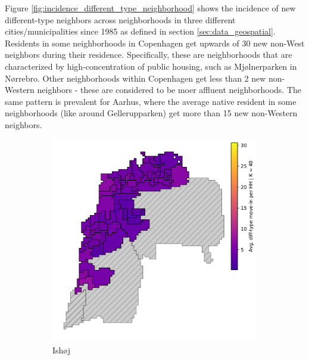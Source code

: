 \documentclass[main.tex]{subfiles}
\begin{document}
Figure \ref{fig:incidence_different_type_neighborhood} shows the incidence of new different-type neighbors across neighborhoods in three different cities/municipalities since 1985 as defined in section \ref{sec:data_geospatial}. Residents in some neighborhoods in Copenhagen get upwards of 30 new non-West neighbors during their residence. Specifically, these are neighborhoods that are characterized by high-concentration of public housing, such as Mjølnerparken in Nørrebro. Other neighborhoods within Copenhagen get less than 2 new non-Western neighbors - these are considered to be moer affluent neighborhoods. The same pattern is prevalent for Aarhus, where the average native resident in some neighborhoods (like around Gellerupparken) get more than 15 new non-Western neighbors.

\begin{figure}
\centering
\caption{Incidence of new different-type neighbors at the neighborhood level (1985-2020)} \label{fig:incidence_different_type_neighborhood}
	\begin{subfigure}{.5\textwidth}	
	\centering
	\includegraphics[width=\textwidth]{figs/ishoj_howdy_neighbor_sample.pdf}	
	\caption{Ishøj} \label{fig:incidence_different_type_ishoj}
	\end{subfigure}
    \begin{subfigure}{.42\textwidth}	
	\centering

\end{subfigure}
\end{figure}
\end{document}
